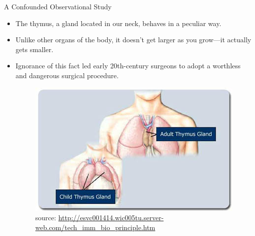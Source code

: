 \documentclass[handout]{beamer}
\begin{document}
\begin{frame}{A Confounded Observational Study}
\scriptsize{

\begin{itemize}

 \item The thymus, a gland located in our neck, behaves in a peculiar way. 
 
 \item Unlike other organs of the body, it doesn't get larger as you grow—it actually gets smaller. 
 \item Ignorance of this fact led early 20th-century surgeons to adopt a worthless and dangerous surgical procedure.
 
 \begin{figure}[h!]
	\centering
	\includegraphics[scale=0.4]{pics/ThymusSizeDiagram.jpg}
	\caption{source: \url{http://esvc001414.wic005tu.server-web.com/tech_imm_bio_principle.htm}}
\end{figure}
 
  
\end{itemize}



} 
\end{frame}
\end{document}
